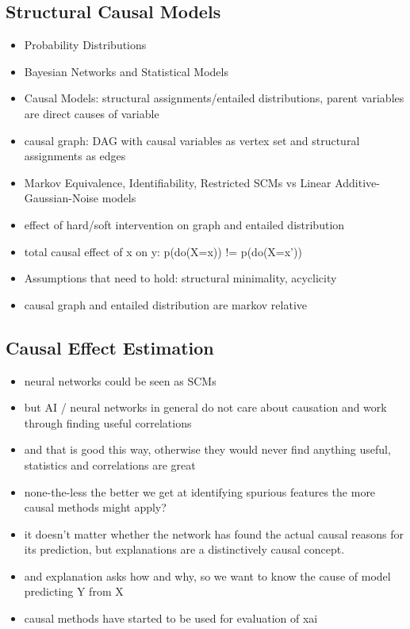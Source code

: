 \subsection{Structural Causal Models}
\begin{itemize}
    \item Probability Distributions
    \item Bayesian Networks and Statistical Models
    \item Causal Models: structural assignments/entailed distributions, parent variables are direct causes of variable 
    \item causal graph: DAG with causal variables as vertex set and structural assignments as edges
    \item Markov Equivalence, Identifiability, Restricted SCMs vs Linear Additive-Gaussian-Noise models
    \item effect of hard/soft intervention on graph and entailed distribution
    \item total causal effect of x on y: p(do(X=x)) != p(do(X=x'))
    \item Assumptions that need to hold: structural minimality, acyclicity
    \item causal graph and entailed distribution are markov relative
\end{itemize}

\subsection{Causal Effect Estimation}

\begin{itemize}
    
    \item neural networks could be seen as SCMs \cite{Chattopadhyay2019}
    \item but AI / neural networks in general do not care about causation and work through finding useful correlations
    \item and that is good this way, otherwise they would never find anything useful, statistics and correlations are great
    \item none-the-less the better we get at identifying spurious features the more causal methods might apply?
    \item it doesn't matter whether the network has found the actual causal reasons for its prediction, but explanations are a distinctively causal concept.
    \item and explanation asks how and why, so we want to know the cause of model predicting Y from X
    \item causal methods have started to be used for evaluation of xai
\end{itemize}

